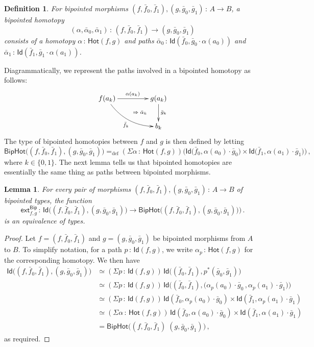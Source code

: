 \documentclass[10pt,a4paper,oneside,reqno]{amsart}
\numberwithin{equation}{section}
\theoremstyle{mythm}
\newtheorem{lemma}[theorem]{Lemma}
\theoremstyle{mydef}
\newtheorem{definition}[theorem]{Definition}
\theoremstyle{myrmk}
\newcommand{\defeq}{=_{\mathrm{def}}}
\newcommand{\co}{\,{:}\,}
\newcommand{\ct}{\cdot}
\newcommand{\Hot}{\mathsf{Hot}}
\newcommand{\ext}{\mathsf{ext}}
\newcommand{\Id}{\mathsf{Id}}
\newcommand{\Bip}{\mathsf{Bip}}
\newcommand{\BipHot}{\mathsf{BipHot}}
\begin{document}
\begin{definition} \label{thm:biphomotopy} For bipointed morphisms $(f, \bar{f}_0, \bar{f}_1) , (g, \bar{g}_0, \bar{g}_1) \co A \to B$, 
a \emph{bipointed homotopy} 
\[
(\alpha, \bar{\alpha}_0, \bar{\alpha}_1) \co (f, \bar{f}_0, \bar{f}_1) \to  (g, \bar{g}_0, \bar{g}_1)
\] 
consists of a homotopy $\alpha \co  \Hot(f, g)$ and paths
$\bar{\alpha}_0 \co \Id(  \bar{f}_0 ,  \bar{g}_0 \ct \alpha(a_0)  )$ and $\bar{\alpha}_1 \co \Id(
\bar{f}_1 , \bar{g}_1 \ct  \alpha(a_1))$. 
\end{definition}

Diagrammatically, we represent the paths  involved in a bipointed homotopy as follows:
\[
\xymatrix@C=1.5cm{
f(a_k) \ar[r]^{\alpha(a_k)}  \ar@/_1pc/[dr]_{\bar{f}_k}  
\ar@{}[dr]|{\qquad \Rightarrow \; \bar{\alpha}_k}  & g(a_k) \ar[d]^{\bar{g}_k}  \\ 
 & b_k }
  \] 
The type of bipointed homotopies between $f$ and $g$ is then defined by letting
\[
 \BipHot  \big( (f,\bar{f}_0, \bar{f}_1), (g, \bar{g}_0, \bar{g}_1) \big)   \defeq   
 (\Sigma \alpha \co \Hot( f , g)) \big( 
  \Id\big( \bar{f}_0 ,  \alpha(a_0)  \ct \bar{g}_0 \big) \times 
  \Id \big( \bar{f}_1,  \alpha(a_1) \ct  \bar{g}_1 \big) \big) \, ,
\]
where $k \in \{ 0, 1\}$. The next lemma tells us that bipointed homotopies are essentially the
same thing as paths between bipointed morphisms.


\begin{lemma} \label{BoolHomSpace} 
For every  pair of morphisms $(f, \bar{f}_0, \bar{f}_1), (g, \bar{g}_0, \bar{g}_1) \co A \to B$ of bipointed types, the
function 
\[
\ext^{\Bip}_{f,g} \co \Id \big( (f, \bar{f}_0, \bar{f}_1), (g, \bar{g}_0, \bar{g}_1) \big) \to 
\BipHot\big( (f, \bar{f}_0, \bar{f}_1), (g, \bar{g}_0, \bar{g}_1) ) \big) \, .
\]
is an equivalence of types.
\end{lemma}

\begin{proof} Let  $f = (f, \bar{f}_0, \bar{f}_1)$ and $g = (g, \bar{g}_0, \bar{g}_1)$ be bipointed
morphisms from $A$ to $B$. To simplify notation, for a path $p \co \Id( f, g)$, we write $\alpha_p \co \Hot(f, g)$
for the corresponding homotopy. We then have
\begin{align*}
 \Id \big( (f,\bar{f}_0,\bar{f}_1) , (g,\bar{g}_0,\bar{g}_1)  \big)
  &  \simeq (\Sigma p \co \Id( f, g))  \, \Id \big(  (\bar{f}_0,\bar{f}_1),  p^{\ast} (\bar{g}_0,\bar{g}_1) \big) \\
  & \simeq
(\Sigma  p \co \Id(f ,  g)) \, \Id\big( (\bar{f}_0,\bar{f}_1),  \big(\alpha_p(a_0) \ct \bar{g}_0 \, ,  \alpha_p(a_1) \ct \bar{g}_1) \big) \\
& \simeq (\Sigma p  \co \Id(f,g))  \, \Id(\bar{f}_0, \alpha_p(a_0) \ct \bar{g}_0) \times \Id( \bar{f}_1, \alpha_p(a_1) \ct \bar{g}_1) \\
& \simeq (\Sigma \alpha \co \Hot(f, g)) \,  \Id(\bar{f}_0, \alpha(a_0) \ct \bar{g}_0) \times \Id(\bar{f}_1, \alpha(a_1) \ct \bar{g}_1) \\
& = \BipHot \big( (f,\bar{f}_0,\bar{f}_1) \; (g,\bar{g}_0,\bar{g}_1) \big) \, , 
\end{align*} 
as required.
\end{proof}
\end{document}

